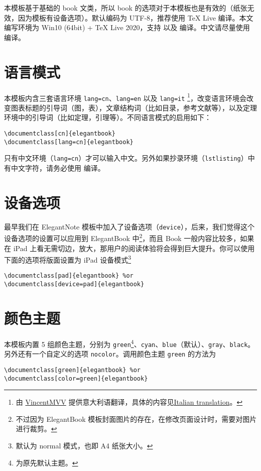 \documentclass[cn,11pt]{elegantbook}
\begin{document}
本模板基于基础的 book 文类，所以 book 的选项对于本模板也是有效的（纸张无效，因为模板有设备选项）。默认编码为 UTF-8，推荐使用 \TeX{} Live 编译。本文编写环境为 Win10 (64bit) + \TeX{} Live 2020，支持  以及  编译。中文请尽量使用  编译。

\section{语言模式}
本模板内含三套语言环境 \lstinline{lang=cn}、\lstinline{lang=en} 以及 \lstinline{lang=it} \footnote{由 \href{https://github.com/VincentMVV}{VincentMVV} 提供意大利语翻译，具体的内容见\href{https://github.com/ElegantLaTeX/ElegantBook/issues/85}{Italian translation}。}，改变语言环境会改变图表标题的引导词（图，表），文章结构词（比如目录，参考文献等），以及定理环境中的引导词（比如定理，引理等）。不同语言模式的启用如下：
\begin{lstlisting}
\documentclass[cn]{elegantbook} 
\documentclass[lang=cn]{elegantbook}
\end{lstlisting}

\begin{remark}
只有中文环境（\lstinline{lang=cn}）才可以输入中文。另外如果抄录环境（\lstinline{lstlisting}）中有中文字符，请务必使用  编译。
\end{remark}

\section{设备选项}
最早我们在 ElegantNote 模板中加入了设备选项（\lstinline{device}），后来，我们觉得这个设备选项的设置可以应用到 ElegantBook 中\footnote{不过因为 ElegantBook 模板封面图片的存在，在修改页面设计时，需要对图片进行裁剪。}，而且 Book 一般内容比较多，如果在 iPad 上看无需切边，放大，那用户的阅读体验将会得到巨大提升。你可以使用下面的选项将版面设置为 iPad 设备模式\footnote{默认为 normal 模式，也即 A4 纸张大小。}
\begin{lstlisting}
\documentclass[pad]{elegantbook} %or
\documentclass[device=pad]{elegantbook}
\end{lstlisting}

\section{颜色主题}

本模板内置 5 组颜色主题，分别为 \textcolor{structure1}{\lstinline{green}}\footnote{为原先默认主题。}、\textcolor{structure2}{\lstinline{cyan}}、\textcolor{structure3}{\lstinline{blue}}（默认）、\textcolor{structure4}{\lstinline{gray}}、\textcolor{structure5}{\lstinline{black}}。另外还有一个自定义的选项  \lstinline{nocolor}。调用颜色主题 \lstinline{green} 的方法为 
\begin{lstlisting}
\documentclass[green]{elegantbook} %or
\documentclass[color=green]{elegantbook}
\end{lstlisting}
\end{document}
